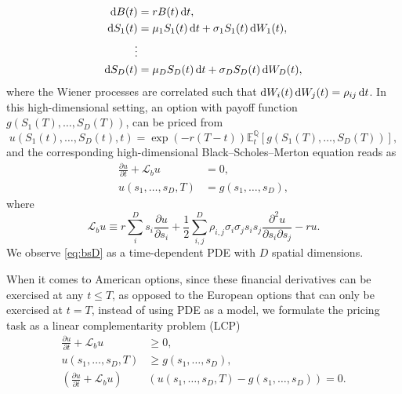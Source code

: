 \documentclass{UUThesisTemplate}
\begin{document}
\begin{align}
\dif B(t)&=rB(t)\dif t, \nonumber \\
\dif S_1(t)&=\mu_1 S_1(t)\dif t+\sigma_1 S_1(t)\dif W_1(t), \nonumber \\
\vdots \nonumber \\ 
\dif S_D(t)&=\mu_D S_D(t)\dif t+\sigma_D S_D(t)\dif W_D(t), \label{eq:multi}
\end{align}
where the Wiener processes are correlated such that $\dif W_i(t)\dif W_j(t)=\rho_{ij}\dif t$. In this high-dimensional setting, an option with payoff function $g(S_1(T),\ldots,S_D(T))$, can be priced from 
\begin{equation}
\label{eq:mcD}
u(S_1(t),\ldots,S_D(t),t)=\exp\left(-r(T-t)\right)\mathbb{E}^{{{\mathbb{Q}}}}_{t}[g(S_1(T),\ldots,S_D(T))],
\end{equation}
and the corresponding high-dimensional Black--Scholes--Merton equation reads as
\begin{align}
\frac{\partial u}{\partial t}+\mathcal{L}_b u&=0, \nonumber \\
u(s_1,\ldots,s_D,T)&=g(s_1,\ldots,s_D), \label{eq:bsD}
\end{align}
where
\begin{equation}
\label{eqBSop}
\mathcal{L}_b u \equiv r\sum\limits_{i}^{D}s_i\frac{\partial u}{\partial{s_i}}+\frac{1}{2}\sum\limits_{i,j}^{D}\rho_{i,j}\sigma_i\sigma_j s_is_j\frac{\partial^2u}{\partial s_i \partial s_j}-ru.
\end{equation}
We observe \eqref{eq:bsD} as a time-dependent PDE with $D$ spatial dimensions.
\par When it comes to American options, since these financial derivatives can be exercised at any $t \leq T$, as opposed to the European options that can only be exercised at $t=T$, instead of using PDE as a model, we formulate the pricing task as a linear complementarity problem (LCP)
\begin{align}
\frac{\partial u}{\partial t}+\mathcal{L}_b u&\geq 0,\nonumber \\
u(s_1,\ldots, s_D,T)&\geq g(s_1,\ldots, s_D), \nonumber \\
\left( \frac{\partial u}{\partial t}+\mathcal{L}_b u\right)& \left(u(s_1,\ldots, s_D,T)-g(s_1,\ldots, s_D)\right)=0. \label{eqlcp}
\end{align}
%
\end{document}

